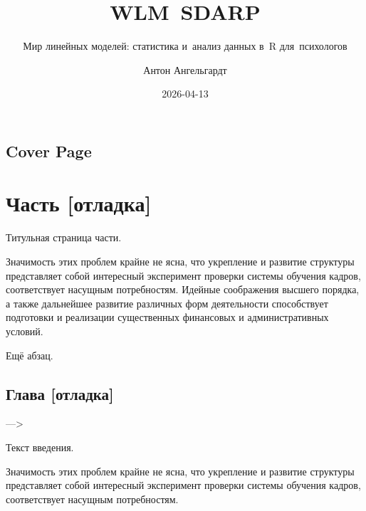 \documentclass[
  russian,
  letterpaper,
  DIV=11,
  numbers=noendperiod,
  oneside]{scrreprt}
\title{WLM~SDARP}
\subtitle{Мир линейных моделей: статистика и~анализ данных в~R
для~психологов}
\author{Антон Ангельгардт}
\date{2026-04-13}
\renewcommand*\contentsname{Содержание}
\newcommand\contentsname{Содержание}
\theoremstyle{definition}
\theoremstyle{plain}
\theoremstyle{plain}
\theoremstyle{definition}
\theoremstyle{plain}
\theoremstyle{plain}
\theoremstyle{plain}
\theoremstyle{plain}
\theoremstyle{definition}
\theoremstyle{remark}
\newcommand*\circled[1]{\tikz[baseline=(char.base)]{
          \node[shape=circle,draw,inner sep=1pt] (char) {{\scriptsize#1}};}}
\begin{document}
\maketitle

\renewcommand*\contentsname{Содержание}
{
\hypersetup{linkcolor=}
\setcounter{tocdepth}{2}
\tableofcontents
}


\chapter{Cover Page}\label{cover-page}

\part{Часть {[}отладка{]}}

Титульная страница части.

Значимость этих проблем крайне не ясна, что укрепление и развитие
структуры представляет собой интересный эксперимент проверки системы
обучения кадров, соответствует насущным потребностям. Идейные
соображения высшего порядка, а также дальнейшее развитие различных форм
деятельности способствует подготовки и реализации существенных
финансовых и административных условий.

Ещё абзац.

\chapter{Глава
{[}отладка{]}}\label{ux433ux43bux430ux432ux430-ux43eux442ux43bux430ux434ux43aux430}

\newcommand{\circled}[1]{\enclose{circle}{#1}}

\newcommand{\const}{\text{const}}
\newcommand{\fix}{\text{fix}}
\DeclareMathOperator{\sgn}{sgn}
\newcommand{\lp}{\left(}
\newcommand{\rp}{\right)}
\newcommand{\lb}{\left[}
\newcommand{\rb}{\right]}

\newcommand{\defin}[1]{\overset{\text{def}}{#1}}
\newcommand{\toas}{\overset{\text{a.s.}}{\to}}
\newcommand{\toprob}{\overset{p}{\to}}
\newcommand{\todist}{\overset{d}{\to}}

\newcommand{\true}{\mathsf{T}}
\newcommand{\false}{\mathsf{F}}

---\textgreater{}

Текст введения.

Значимость этих проблем крайне не ясна, что укрепление и развитие
структуры представляет собой интересный эксперимент проверки системы
обучения кадров, соответствует насущным потребностям.
\end{document}
